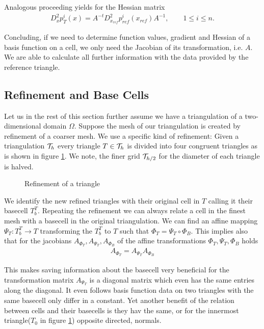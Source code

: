 \begin{example}
Analogous proceeding yields for the Hessian matrix
\begin{align}
D_x^2p_T^i(x) = A^{-t} D_{x_{ref}}^2p^i_{ref}(x_{ref})  A^{-1}, \qquad 1 \leq i \leq n.
\end{align}

Concluding, if we need to determine function values, gradient and Hessian of a basis function on a cell, we only need the Jacobian of its transformation, i.e. $A$. We are able to calculate all further information with the data provided by the reference triangle.
\end{example}

\subsection{Refinement and Base Cells}\label{subsec: refinement and base cells}
Let us in the rest of this section further assume we have a triangulation of a two-dimensional domain $\Omega$. 
Suppose the mesh of our triangulation is created by refinement of a coarser mesh. We use a specific kind of refinement: Given a triangulation $\mathcal{T}_h$ every triangle $T \in \mathcal{T}_h$ is divided into four congruent triangles as is shown in figure \ref{pic: refinement}. We note, the finer grid $\mathcal{T}_{h/2}$ for the diameter of each triangle is halved.

\begin{figure}[h]

\caption{Refinement of a triangle}
 \label{pic: refinement}
\end{figure}

We identify the new refined triangles with their original cell in $T$ calling it their basecell $T^T_b$. Repeating the refinement we can always relate a cell in the finest mesh with a basecell in the original triangulation. We can find an affine mapping $\Psi_T:T^T_b \rightarrow T$ transforming the $T^T_b$ to $T$ such that $\Phi_T = \Psi_T \circ \Phi_B$. This implies also that for the jacobians $A_{\Phi_T}, A_{\Psi_T}, A_{\Phi_B}$ of the affine transformations $\Phi_T, \Psi_T,\Phi_B$ holds
\begin{align}
A_{\Phi_T}=A_{\Psi_T} A_{\Phi_B}
\end{align} 

This makes saving information about the basecell very beneficial for the transformation matrix $A_{\Psi_T}$ is a diagonal matrix which even has the same entries along the diagonal. It even follows basis function data on two triangles with the same basecell only differ in a constant. Yet another benefit of the relation between cells and their basecells is they hav the same, or for the innermost triangle($T_0$ in figure \ref{pic: refinement}) opposite directed, normals.

